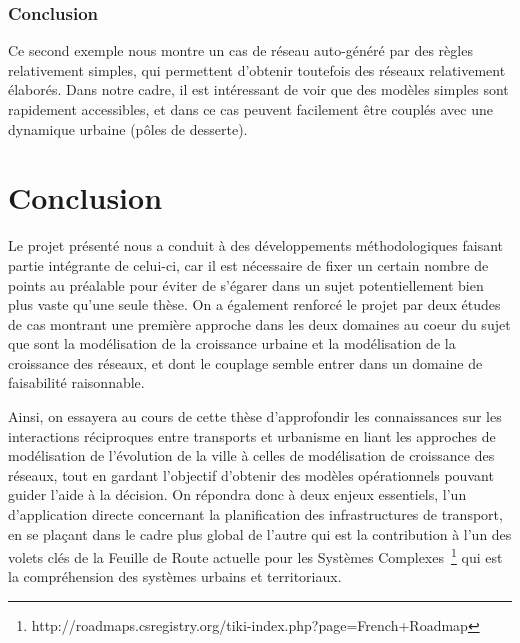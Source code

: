 \documentclass[french,12pt]{article}
\begin{document}
\subsubsection{Conclusion}

Ce second exemple nous montre un cas de réseau auto-généré par des règles relativement simples, qui permettent d’obtenir toutefois des réseaux relativement élaborés. Dans notre cadre, il est intéressant de voir que des modèles simples sont rapidement accessibles, et dans ce cas peuvent facilement être couplés avec une dynamique urbaine (pôles de desserte).





\newpage


\section*{Conclusion}

Le projet présenté nous a conduit à des développements méthodologiques faisant partie intégrante de celui-ci, car il est nécessaire de fixer un certain nombre de points au préalable pour éviter de s’égarer dans un sujet potentiellement bien plus vaste qu’une seule thèse. On a également renforcé le projet par deux études de cas montrant une première approche dans les deux domaines au coeur du sujet que sont la modélisation de la croissance urbaine et la modélisation de la croissance des réseaux, et dont le couplage semble entrer dans un domaine de faisabilité raisonnable.

\vspace{1cm}

Ainsi, on essayera au cours de cette thèse d'approfondir les connaissances sur les interactions réciproques entre transports et urbanisme en liant les approches de modélisation de l'évolution de la ville à celles de modélisation de croissance des réseaux, tout en gardant l'objectif d'obtenir des modèles opérationnels pouvant guider l'aide à la décision. On répondra donc à deux enjeux essentiels, l'un d'application directe concernant la planification des infrastructures de transport, en se plaçant dans le cadre plus global de l'autre qui est la contribution à l'un des volets clés de la Feuille de Route actuelle pour les Systèmes Complexes~\footnote{http://roadmaps.csregistry.org/tiki-index.php?page=French+Roadmap} qui est la compréhension des systèmes urbains et territoriaux.

\newpage{}



\end{document}
